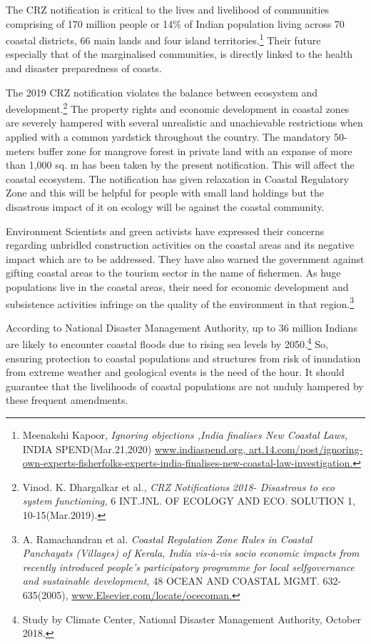 \begin{multicols}{2}
\noi
The CRZ notification is critical to the lives and livelihood of communities comprising of
170 million people or 14\% of Indian population living across 70 coastal districts, 66 main 
lands and four island territories.\footnote{Meenakshi Kapoor, \textit{Ignoring objections ,India finalises New Coastal Laws,} INDIA SPEND(Mar.21,2020)
\url{www.indiaspend.org, art.14.com/post/ignoring-own-experts-fisherfolks-experts-india-finalises-new-coastal-law-investigation.}} Their future especially that of the marginalised
communities, is directly linked to the health and disaster preparedness of coasts.

\noi
The 2019 CRZ notification violates the balance between ecosystem and development.\footnote{Vinod. K. Dhargalkar et al., \textit{CRZ Notifications 2018- Disastrous to eco system functioning,} 6 INT.JNL. OF
ECOLOGY AND ECO. SOLUTION 1, 10-15(Mar.2019).}
The property rights and economic development in coastal zones are severely hampered
with several unrealistic and unachievable restrictions when applied with a common
yardstick throughout the country. The mandatory 50-meters buffer zone for mangrove
forest in private land with an expanse of more than 1,000 sq. m has been taken by the
present notification. This will affect the coastal ecosystem. The notification has given
relaxation in Coastal Regulatory Zone and this will be helpful for people with small land
holdings but the disastrous impact of it on ecology will be against the coastal community.

\noi
Environment Scientists and green activists have expressed their concerns regarding
unbridled construction activities on the coastal areas and its negative impact which are to
be addressed. They have also warned the government against gifting coastal areas to the
tourism sector in the name of fishermen. As huge populations live in the coastal areas, their
need for economic development and subsistence activities infringe on the quality of the
environment in that region.\footnote{A. Ramachandran et al. \textit{Coastal Regulation Zone Rules in Coastal Panchayats (Villages) of Kerala, India vis-à-vis socio economic impacts from recently introduced people’s participatory programme for local selfgovernance and sustainable development,} 48 OCEAN AND COASTAL MGMT. 632- 635(2005), \url{www.Elsevier.com/locate/ocecoman.}}

\noi
According to National Disaster Management Authority, up to 36 million Indians are likely
to encounter coastal floods due to rising sea levels by 2050.\footnote{Study by Climate Center, National Disaster Management Authority, October 2018.} So, ensuring protection to
coastal populations and structures from risk of inundation from extreme weather and
geological events is the need of the hour. It should guarantee that the livelihoods of coastal
populations are not unduly hampered by these frequent amendments.


\end{multicols}
